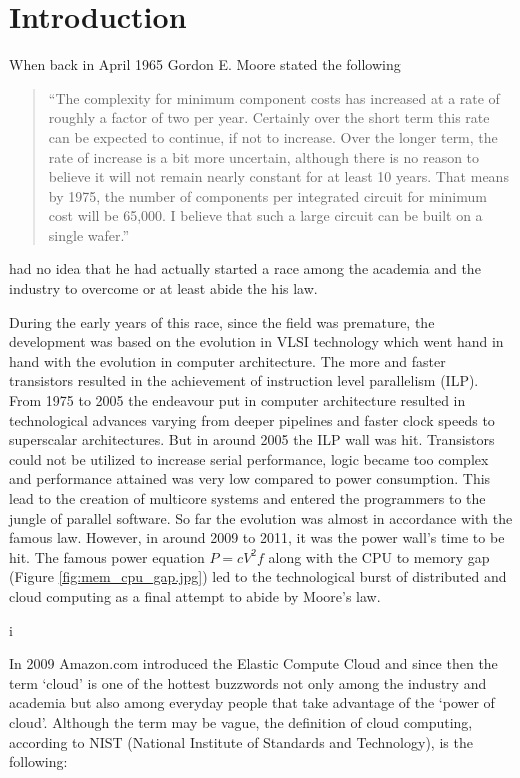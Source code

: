 \chapter{Introduction}\label{ch:intro}

When back in April 1965 Gordon E. Moore stated the following 
\begin{quotation}
    ``The complexity for minimum component costs has increased at a rate of 
    roughly a factor of two per year. Certainly over the short term this rate 
    can be expected to continue, if not to increase. Over the longer term, the 
    rate of increase is a bit more uncertain, although there is no reason to 
    believe it will not remain nearly constant for at least 10 years. That 
    means by 1975, the number of components per integrated circuit for minimum 
    cost will be 65,000. I believe that such a large circuit can be built on a 
    single wafer.''\cite{Moore}
\end{quotation}

had no idea that he had actually started a race among the academia and the
industry to overcome or at least abide the his law.

During the early years of this race, since the field was premature, the
development was based on the evolution in VLSI technology which went hand in
hand with the evolution in computer architecture. The more and faster
transistors resulted in the achievement of instruction level parallelism (ILP).
From 1975 to 2005 the endeavour put in computer architecture resulted in
technological advances varying from deeper pipelines and faster clock speeds to
superscalar architectures. But in around 2005 the ILP wall was hit. Transistors
could not be utilized to increase serial performance, logic became too complex
and performance attained was very low compared to power consumption. This lead
to the creation of multicore systems and entered the programmers to the jungle
of parallel software. So far the evolution was almost in accordance with the
famous law. However, in around 2009 to 2011, it was the power wall's time to be
hit. The famous power equation $P=cV^2f$ along with the CPU to memory gap
(Figure \ref{fig:mem_cpu_gap.jpg}) led to the technological burst of
distributed and cloud computing as a final attempt to abide by Moore's law.

i

In 2009 Amazon.com introduced the Elastic Compute Cloud and since then the term
`cloud' is one of the hottest buzzwords not only among the industry and academia
but also among everyday people that take advantage of the `power of cloud'.
Although the term may be vague, the definition of cloud computing, according to
NIST (National Institute of Standards and Technology), is the following:

